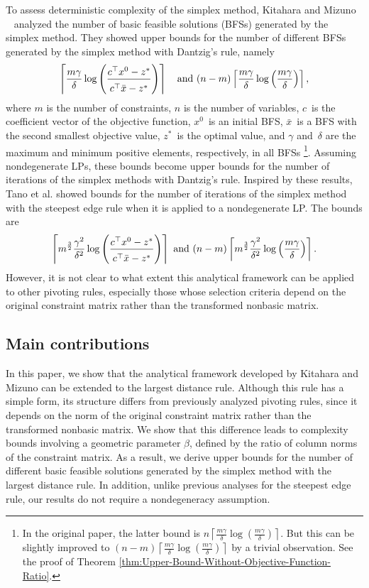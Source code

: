 \documentclass[12pt]{article}
\newcommand{\getheight}{\rule{0em}{2.5ex}}
\begin{document}
To assess deterministic complexity of the simplex method, Kitahara and Mizuno ~\cite{km2013} analyzed 
the number of basic feasible solutions (BFSs) generated by the simplex method.
They showed upper bounds for the number of different BFSs generated by the simplex method with Dantzig's rule, namely
\begin{equation} \notag
  \left\lceil \frac{m\gamma}{\delta} \log\left( \frac{\getheight c^{\top}x^0-z^*}{\getheight c^{\top}\bar{x}-z^*} \right) \right\rceil \quad \mathrm{and}~
 (n-m) \left\lceil \frac{m\gamma}{\delta} \log\left(\frac{m\gamma}{\delta}\right) \right\rceil,
\end{equation}
where $m$ is the number of constraints, $n$ is the number of variables, $c$~is the coefficient vector of the objective function, $x^0$~is an initial BFS, $\bar{x}$~is a BFS with the second smallest objective value, $z^*$~is the optimal value, and $\gamma$ and~$\delta$ are the maximum and minimum positive elements, respectively, in all BFSs
\footnote{In the original paper, the latter bound is $n \left\lceil \frac{m\gamma}{\delta} \log\left(\frac{m\gamma}{\delta}\right) \right\rceil$. 
But this can be slightly improved to $ (n-m) \left\lceil \frac{m\gamma}{\delta} \log\left(\frac{m\gamma}{\delta}\right) \right\rceil$ by a trivial observation. 
See the proof of Theorem  \ref{thm:Upper-Bound-Without-Objective-Function-Ratio}.}.
Assuming nondegenerate LPs, these bounds become upper bounds for the number of iterations of the simplex methods with Dantzig's rule.
Inspired by these results, Tano et al. \cite{tano2019} showed bounds for the number of iterations of the simplex method with the steepest edge rule 
when it is applied to a nondegenerate LP.
The bounds are 
\[
\left\lceil m^{\frac{3}{2}} \frac{\gamma^2}{\delta^2} \log\left( \frac{\getheight c^{\top}x^0-z^*}{\getheight c^{\top}\bar{x}-z^*} \right) \right\rceil~\mathrm{and}~
(n-m) \left\lceil m^{\frac{3}{2}} \frac{\gamma^2}{\delta^2} \log\left(\frac{m\gamma}{\delta}\right) \right\rceil.
\]  
However, it is not clear to what extent this analytical framework can be applied to other pivoting rules, especially those whose selection criteria depend on the original constraint matrix rather than the transformed nonbasic matrix.
%
\subsection{Main contributions}
In this paper, we show that the analytical framework developed by Kitahara and Mizuno can be extended to the largest distance rule.
Although this rule has a simple form, its structure differs from previously analyzed pivoting rules, since it depends on the norm of the original constraint matrix rather than the transformed nonbasic matrix. We show that this difference leads to complexity bounds involving a geometric parameter $\beta$, defined by the ratio of column norms of the constraint matrix.
As a result, we derive upper bounds for the number of different basic feasible solutions generated by the simplex method with the largest distance rule. In addition, unlike previous analyses for the steepest edge rule, our results do not require a nondegeneracy assumption.
%
\end{document}
